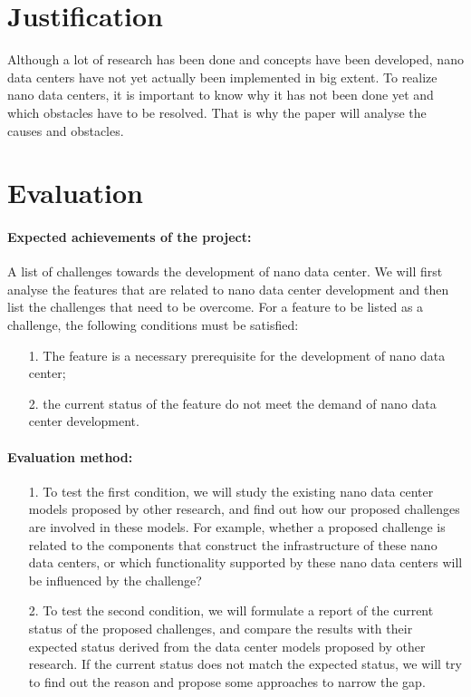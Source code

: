 \documentclass[sigchi-a, authorversion]{acmart}
\begin{document}
\section{Justification} %
Although a lot of research has been done and concepts have been developed, nano data centers have not yet actually been implemented in big extent. To realize nano data centers, it is important to know why it has not been done yet and which obstacles have to be resolved. That is why the paper will analyse the causes and obstacles.

\section{Evaluation} %

\paragraph{Expected achievements of the project:} A list of challenges towards the development of nano data center.
We will first analyse the features that are related to nano data center development and then list the challenges that need to be overcome. 
For a feature to be listed as a challenge, 
the following conditions must be satisfied:
\begin{enumerate}
\item[1.] The feature is a necessary prerequisite for the development of nano data center;
\item[2.] the current status of the feature do not meet the demand of nano data center development. 
\end{enumerate}

\paragraph{Evaluation method:} 
\begin{enumerate}
\item[1.] To test the first condition, 
we will study the existing nano data center models proposed by other research, 
and find out how our proposed challenges are involved in these models. 
For example, whether a proposed challenge is related to the components that construct the infrastructure of these nano data centers,
or which functionality supported by these nano data centers will be influenced by the challenge?
\item[2.] To test the second condition,
we will formulate a report of the current status of the proposed challenges,
and compare the results with their expected status derived from the data center models proposed by other research.
If the current status does not match the expected status,
we will try to find out the reason and propose some approaches to narrow the gap.
\end{enumerate}
\end{document}
